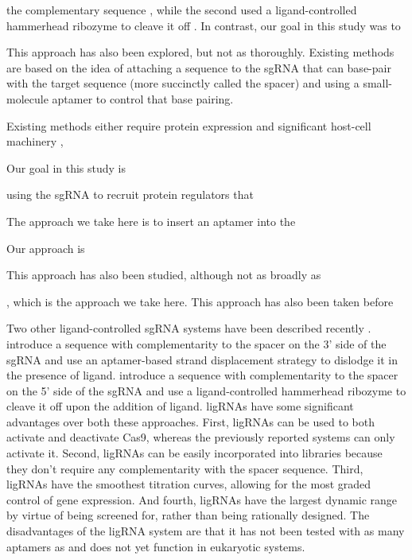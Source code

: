 \documentclass[10pt,oneside]{article}
\begin{document}
the complementary sequence \autocite{liu2016}, while the second used a ligand-controlled hammerhead ribozyme to cleave it off \autocite{tang2017}.  In contrast, our goal in this study was to 

This approach has also been explored, but not as thoroughly.  Existing methods are based on the idea of attaching a sequence to the sgRNA that can base-pair with the  target sequence (more succinctly called the spacer) and using a small-molecule aptamer to control that base pairing.

Existing methods either require protein expression and significant host-cell machinery \autocite{???}, 


Our goal in this study is 


using the sgRNA to recruit protein regulators that 

The approach we take here is to insert an aptamer into the

Our approach is 

This approach has also been studied, although not as broadly as 

, which is the approach we take here.  This approach has also been taken before


Two other ligand-controlled sgRNA systems have been described recently \autocite{liu2016,tang2017}.   introduce a sequence with complementarity to the spacer on the 3' side of the sgRNA and use an aptamer-based strand displacement strategy to dislodge it in the presence of ligand.   introduce a sequence with complementarity to the spacer on the 5' side of the sgRNA and use a ligand-controlled hammerhead ribozyme to cleave it off upon the addition of ligand.  ligRNAs have some significant advantages over both these approaches.  First, ligRNAs can be used to both activate and deactivate Cas9, whereas the previously reported systems can only activate it.  Second, ligRNAs can be easily incorporated into libraries because they don't require any complementarity with the spacer sequence.  Third, ligRNAs have the smoothest titration curves, allowing for the most graded control of gene expression.  And fourth, ligRNAs have the largest dynamic range by virtue of being screened for, rather than being rationally designed.  The disadvantages of the ligRNA system are that it has not been tested with as many aptamers as  and does not yet function in eukaryotic systems.
% 
% 
\end{document}
